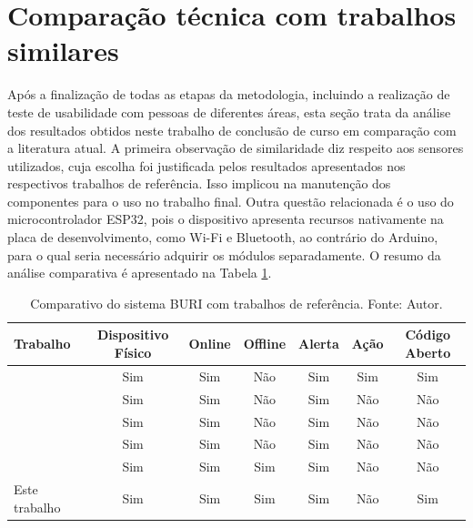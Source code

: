 \section{Comparação técnica com trabalhos similares}\label{comparacao}

Após a finalização de todas as etapas da metodologia, incluindo a realização de teste de usabilidade com pessoas de diferentes áreas, esta seção trata da análise dos resultados obtidos 
neste trabalho de conclusão de curso em comparação com a literatura atual. A primeira observação de similaridade diz respeito aos sensores utilizados, cuja escolha foi justificada pelos resultados 
apresentados nos respectivos trabalhos de referência. Isso implicou na manutenção dos componentes para o uso no trabalho final. Outra questão relacionada é o uso do microcontrolador ESP32, pois o dispositivo apresenta 
recursos nativamente na placa de desenvolvimento, como Wi-Fi e Bluetooth, ao contrário do Arduino, para o qual seria necessário adquirir os módulos separadamente. O resumo da análise comparativa é apresentado na Tabela \ref{tab:trabalhos-comparativo}.

\begin{table}[htbp]
    \centering
    \caption{Comparativo do sistema BURI com trabalhos de referência. Fonte: Autor.}\label{tab:trabalhos-comparativo}
    \begin{tabular}{p{4cm}|c|c|c|c|c|c}
        \toprule
        \textbf{Trabalho} & \textbf{Dispositivo Físico} & \textbf{Online} & \textbf{Offline} & \textbf{Alerta}  & \textbf{Ação} & \textbf{Código Aberto} \\ 
        \midrule
        \cite{uea-iot-deteccao-incendio} & Sim & Sim & Não & Sim & Sim & Sim \\ \midrule
        \cite{iot-monitoring-on-aws} & Sim & Sim & Não & Sim & Não  & Não \\ \midrule
        \cite{UFAMAirWorld} & Sim & Sim & Não & Sim & Não  & Não \\ \midrule
        \cite{tbRelacionado4NovelEmbeddedSystem} & Sim & Sim & Não & Sim & Não & Não \\ \midrule
        \cite{alexandre-automaccao-formulas-de-leitura-sensor} & Sim & Sim & Sim & Sim & Não & Não \\ \midrule
        Este trabalho & Sim & Sim & Sim & Sim & Não & Sim \\
        \bottomrule
    \end{tabular}
\end{table}

